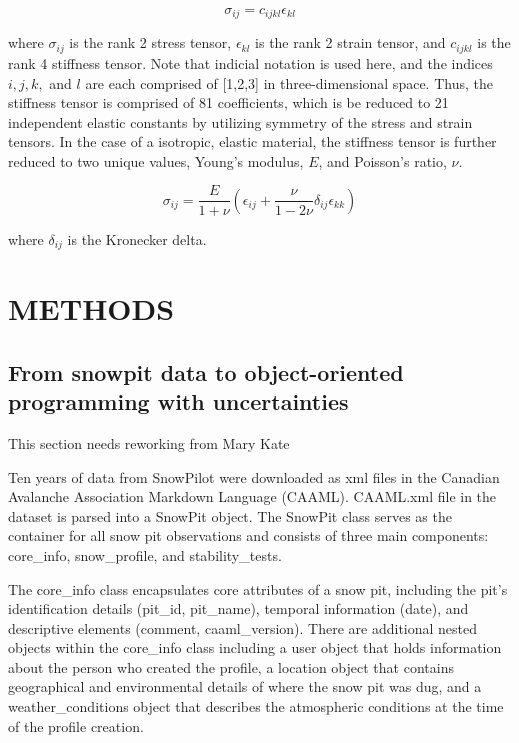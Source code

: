 \documentclass[journal abbreviation, manuscript]{copernicus}
\begin{document}
\begin{equation}
    \sigma_{ij}=c_{ijkl}\epsilon_{kl}
\end{equation}

\noindent where $\sigma_{ij}$ is the rank 2 stress tensor, $\epsilon_{kl}$ is the rank 2 strain tensor, and $c_{ijkl}$ is the rank 4 stiffness tensor. Note that indicial notation is used here, and the indices $i,j,k,$ and $l$ are each comprised of [1,2,3] in three-dimensional space. Thus, the stiffness tensor is comprised of 81 coefficients, which is be reduced to 21 independent elastic constants by utilizing symmetry of the stress and strain tensors. In the case of a isotropic, elastic material, the stiffness tensor is further reduced to two unique values, Young's modulus, $E$, and Poisson's ratio, $\nu$.


\begin{equation}
    \sigma_{ij}=\frac{E}{1+\nu}(\epsilon_{ij}+\frac{\nu}{1-2\nu}\delta_{ij}\epsilon_{kk})
\end{equation}

\noindent where $\delta_{ij}$ is the Kronecker delta.


\section{METHODS}


\subsection{From snowpit data to object-oriented programming with uncertainties}
 \textcolor{RubineRed}{This section needs reworking from Mary Kate}

Ten years of data from SnowPilot were downloaded as xml files in the Canadian Avalanche Association Markdown Language (CAAML). CAAML.xml file in the dataset is parsed into a SnowPit object. The SnowPit class serves as the container for all snow pit observations and consists of three main components: core\_info, snow\_profile, and stability\_tests.  

The core\_info class encapsulates core attributes of a snow pit, including the pit's identification details (pit\_id, pit\_name), temporal information (date), and descriptive elements (comment, caaml\_version). There are additional nested objects within the core\_info class including a user object that holds information about the person who created the profile, a location object that contains geographical and environmental details of where the snow pit was dug, and a weather\_conditions object that describes the atmospheric conditions at the time of the profile creation. 
\end{document}
